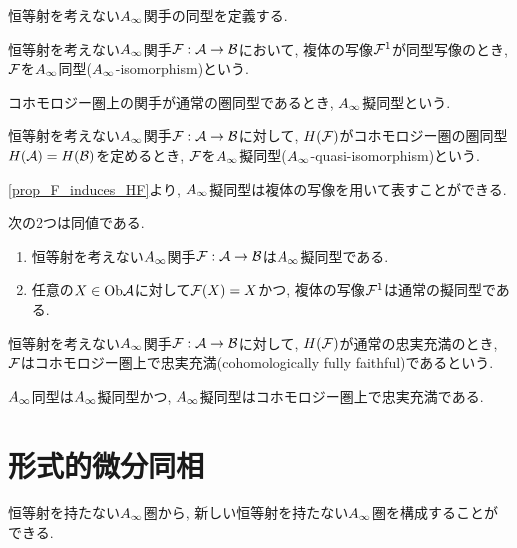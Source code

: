 \documentclass[uplatex, a4paper, 14Q, dvipdfmx]{jsarticle}
\begin{document}
恒等射を考えない$\Ainf$関手の同型を定義する. 

\begin{definition}[$\Ainf$同型]
  恒等射を考えない$\Ainf$関手$\mathcal{F} : \mathcal{A} \to \mathcal{B}$において, 複体の写像$\mathcal{F}^1$が同型写像のとき, $\mathcal{F}$を$\Ainf$同型($\Ainf$-isomorphism)という.
\end{definition}

コホモロジー圏上の関手が通常の圏同型であるとき, $\Ainf$擬同型という. 

\begin{definition}
  恒等射を考えない$\Ainf$関手$\mathcal{F} : \mathcal{A} \to \mathcal{B}$に対して, $H(\mathcal{F})$がコホモロジー圏の圏同型$H(\mathcal{A}) = H(\mathcal{B})$を定めるとき, $\mathcal{F}$を$\Ainf$擬同型($\Ainf$-quasi-isomorphism)という. 
\end{definition}

\cref{prop_F_induces_HF}より, $\Ainf$擬同型は複体の写像を用いて表すことができる. 

\begin{lemma}
  次の2つは同値である. 
  \begin{enumerate}
    \item 恒等射を考えない$\Ainf$関手$\mathcal{F} : \mathcal{A} \to \mathcal{B}$は$\Ainf$擬同型である. 
    \item 任意の$X \in \mathrm{Ob}\mathcal{A}$に対して$\mathcal{F}(X) = X$かつ, 複体の写像$\mathcal{F}^1$は通常の擬同型である. 
  \end{enumerate}
\end{lemma}

\begin{definition}[コホモロジー圏上で忠実充満]
  恒等射を考えない$\Ainf$関手$\mathcal{F} : \mathcal{A} \to \mathcal{B}$に対して, $H(\mathcal{F})$が通常の忠実充満のとき, $\mathcal{F}$はコホモロジー圏上で忠実充満(cohomologically fully faithful)であるという. 
\end{definition}

\begin{example}
  $\Ainf$同型は$\Ainf$擬同型かつ, $\Ainf$擬同型はコホモロジー圏上で忠実充満である. 
\end{example}

\section{形式的微分同相} \label{section_formal_diffeomorphism}

恒等射を持たない$\Ainf$圏から, 新しい恒等射を持たない$\Ainf$圏を構成することができる.

\end{document}

